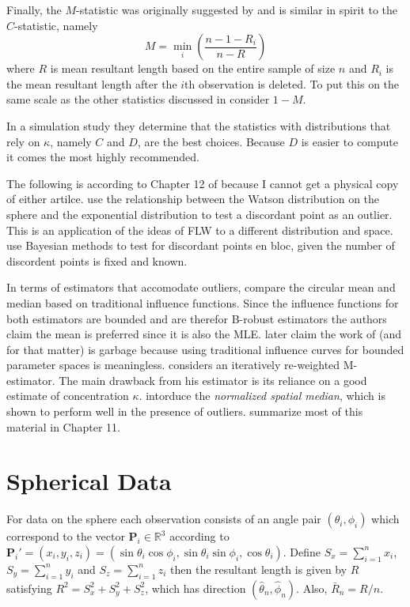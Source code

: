 \documentclass{article}\usepackage[]{graphicx}\usepackage[]{color}
\newcommand{\R}{{\mathbb{R}}}
\begin{document}
Finally, the $M$-statistic was originally suggested by \cite{mardia1975} and is similar in spirit to the $C$-statistic, namely
\[
M=\min_i\left(\frac{n-1-R_i}{n-R}\right)
\]
where $R$ is mean resultant length based on the entire sample of size $n$ and $R_i$ is the mean resultant length after the $i$th observation is deleted.  To put this on the same scale as the other statistics discussed in \cite{collett1980} consider $1-M$.

In a simulation study they determine that the statistics with distributions that rely on $\kappa$, namely $C$ and $D$, are the best choices.  Because $D$ is easier to compute it comes the most highly recommended.

The following is according to Chapter 12 of \cite{mardia2009} because I cannot get a physical copy of either artilce.   \cite{best1986} use the relationship between the Watson distribution on the sphere and the exponential distribution to test a discordant point as an outlier.  This is an application of the ideas of FLW to a different distribution and space. \cite{bagchi1990} use Bayesian methods to test for discordant points en bloc, given the number of discordent points is fixed and known.  

In terms of estimators that accomodate outliers,  \cite{wehrly1981} compare the circular mean and median based on traditional influence functions.  Since the influence functions for both estimators are bounded and are therefor B-robust estimators the authors claim the mean is preferred since it is also the MLE. \cite{ko1988} later claim the work of \cite{wehrly1981} (and \cite{watson1983} for that matter) is garbage because using traditional influence curves for bounded parameter spaces is meaningless.  \cite{lenth1981} considers an iteratively re-weighted M-estimator.  The main drawback from his estimator is its reliance on a good estimate of concentration $\kappa$.  \cite{ducharme1987} intorduce the {\it normalized spatial median}, which is shown to perform well in the presence of outliers.  \cite{barnett1994} summarize most of this material in Chapter 11.


\section{Spherical Data}\label{sec:sphere}

For data on the sphere each observation consists of an angle pair $(\theta_i,\phi_i)$ which correspond to the vector $\bm P_i\in \R^3$ according to $\bm P_i'=(x_i,y_i,z_i)=(\sin\theta_i\cos\phi_i,\sin\theta_i\sin\phi_i,\cos\theta_i)$.  Define $S_x=\sum_{i=1}^nx_i$, $S_y=\sum_{i=1}^ny_i$ and $S_z=\sum_{i=1}^nz_i$ then the resultant length is given by $R$ satisfying $R^2=S_x^2+S_y^2+S_z^2$, which has direction $(\hat\theta_n,\hat\phi_n)$.  Also, $\bar{R}_n=R/n$.
\end{document}
